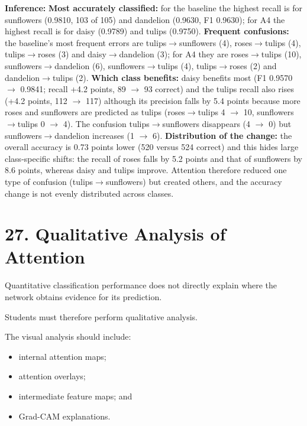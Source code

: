 \documentclass[10pt]{article}
\begin{document}
\textbf{Inference:} \textbf{Most accurately classified:} for the baseline the highest recall is for sunflowers (0.9810, 103 of 105) and dandelion (0.9630, F1 0.9630); for A4 the highest recall is for daisy (0.9789) and tulips (0.9750).
\textbf{Frequent confusions:} the baseline's most frequent errors are tulips$\rightarrow$sunflowers (4), roses$\rightarrow$tulips (4), tulips$\rightarrow$roses (3) and daisy$\rightarrow$dandelion (3); for A4 they are
roses$\rightarrow$tulips (10), sunflowers$\rightarrow$dandelion (6), sunflowers$\rightarrow$tulips (4), tulips$\rightarrow$roses (2) and dandelion$\rightarrow$tulips (2).
\textbf{Which class benefits:} daisy benefits most (F1 0.9570 $\rightarrow$ 0.9841; recall +4.2 points, 89 $\rightarrow$ 93 correct) and the tulips recall also rises (+4.2 points, 112 $\rightarrow$ 117) although its precision falls by 5.4 points because
more roses and sunflowers are predicted as tulips (roses$\rightarrow$tulips 4 $\rightarrow$ 10, sunflowers$\rightarrow$tulips 0 $\rightarrow$ 4). The confusion tulips$\rightarrow$sunflowers disappears (4 $\rightarrow$ 0) but sunflowers$\rightarrow$dandelion increases (1 $\rightarrow$ 6).
\textbf{Distribution of the change:} the overall accuracy is 0.73 points lower (520 versus 524 correct) and this hides large class-specific shifts: the recall of roses falls by 5.2 points and that of sunflowers by 8.6 points, whereas daisy and tulips improve.
Attention therefore reduced one type of confusion (tulips$\rightarrow$sunflowers) but created others, and the accuracy change is not evenly distributed across classes.

\section*{27. Qualitative Analysis of Attention}

Quantitative classification performance does not directly explain where the
network obtains evidence for its prediction.

Students must therefore perform qualitative analysis.

The visual analysis should include:

\begin{itemize}

\item internal attention maps;

\item attention overlays;

\item intermediate feature maps; and

\item Grad-CAM explanations.

\end{itemize}
\end{document}

